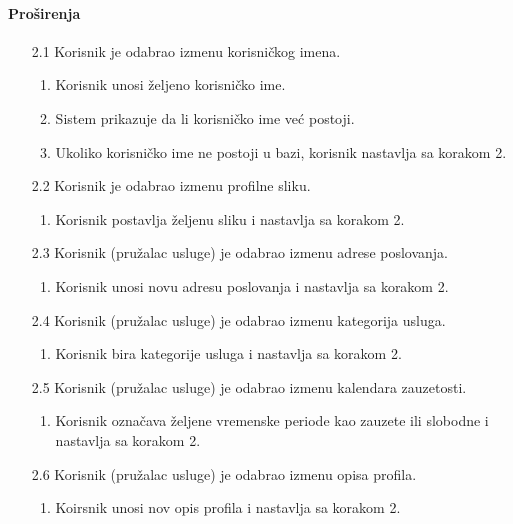\documentclass[a4paper,12pt]{report}
\begin{document}
    \paragraph*{Proširenja} 
    \begin{enumerate}
        \item[2.1] Korisnik je odabrao izmenu korisničkog imena.
        \begin{enumerate}[noitemsep,topsep=-8pt]
            \item Korisnik unosi željeno korisničko ime.
            \item Sistem prikazuje da li korisničko ime već postoji.
            \item Ukoliko korisničko ime ne postoji u bazi, korisnik nastavlja sa korakom 2.
        \end{enumerate}
    
        \item[2.2] Korisnik je odabrao izmenu profilne sliku.
        \begin{enumerate}[noitemsep,topsep=-8pt]
             \item Korisnik postavlja željenu sliku i nastavlja sa korakom 2.
        \end{enumerate}
        
        \item[2.3] Korisnik (pružalac usluge) je odabrao izmenu adrese poslovanja.
        \begin{enumerate}[noitemsep,topsep=-8pt]
        \item Korisnik unosi novu adresu poslovanja i nastavlja sa korakom 2.
        \end{enumerate}
    
        \item[2.4] Korisnik (pružalac usluge) je odabrao izmenu kategorija usluga.
        \begin{enumerate}[noitemsep,topsep=-8pt]
            \item Korisnik bira kategorije usluga i nastavlja sa korakom 2.
        \end{enumerate}
        
        \item[2.5] Korisnik (pružalac usluge) je odabrao izmenu kalendara zauzetosti.
        \begin{enumerate}[noitemsep,topsep=-8pt]
            \item Korisnik označava željene vremenske periode kao zauzete ili slobodne i nastavlja sa korakom 2.
        \end{enumerate}
   
        \item[2.6] Korisnik (pružalac usluge) je odabrao izmenu opisa profila.
         \begin{enumerate}[noitemsep,topsep=-8pt]
        \item Koirsnik unosi nov opis profila i nastavlja sa korakom 2.
        \end{enumerate}
    \end{enumerate}
    
\end{document}
